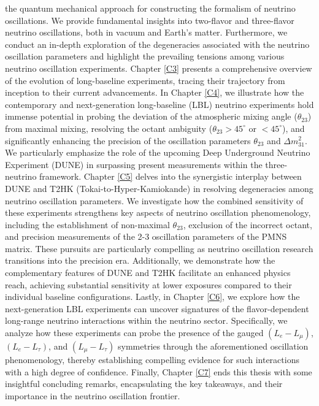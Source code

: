  the quantum mechanical approach for constructing the formalism of neutrino oscillations. We provide fundamental insights into two-flavor and three-flavor neutrino oscillations, both in vacuum and Earth's matter. Furthermore, we conduct an in-depth exploration of the degeneracies associated with the neutrino oscillation parameters and highlight the prevailing tensions among various neutrino oscillation experiments. Chapter \ref{C3} presents a comprehensive overview of the evolution of long-baseline experiments, tracing their trajectory from inception to their current advancements. In Chapter \ref{C4}, we illustrate how the contemporary and next-generation long-baseline (LBL) neutrino experiments hold immense potential in probing the deviation of the atmospheric mixing angle ($\theta_{23}$) from maximal mixing, resolving the octant ambiguity ($\theta_{23}>45^\circ$ or $<45^\circ$), and significantly enhancing the precision of the oscillation parameters $\theta_{23}$ and $\Delta m^2_{31}$. We particularly emphasize the role of the upcoming Deep Underground Neutrino Experiment (DUNE) in surpassing present measurements within the three-neutrino framework. Chapter \ref{C5} delves into the synergistic interplay between DUNE and T2HK (Tokai-to-Hyper-Kamiokande) in resolving degeneracies among neutrino oscillation parameters. We investigate how the combined sensitivity of these experiments strengthens key aspects of neutrino oscillation phenomenology, including the establishment of non-maximal $\theta_{23}$, exclusion of the incorrect octant, and precision measurements of the 2-3 oscillation parameters of the PMNS matrix. These pursuits are particularly compelling as neutrino oscillation research transitions into the precision era. Additionally, we demonstrate how the complementary features of DUNE and T2HK facilitate an enhanced physics reach, achieving substantial sensitivity at lower exposures compared to their individual baseline configurations. Lastly, in Chapter \ref{C6}, we explore how the next-generation LBL experiments can uncover signatures of the flavor-dependent long-range neutrino interactions within the neutrino sector. Specifically, we analyze how these experiments can probe the presence of the gauged $(L_e - L_\mu)$, $(L_e - L_\tau)$, and $(L_\mu - L_\tau)$ symmetries through the aforementioned oscillation phenomenology, thereby establishing compelling evidence for such interactions with a high degree of confidence. Finally, Chapter \ref{C7} ends this thesis with some insightful concluding remarks, encapsulating the key takeaways, and their importance in the neutrino oscillation frontier.


